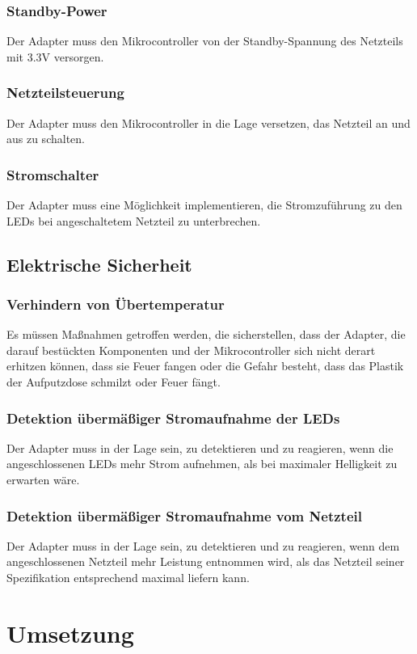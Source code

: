 \documentclass[a4paper,11pt]{article}
\begin{document}
\subsubsection{Standby-Power}
Der Adapter muss den Mikrocontroller
von der Standby-Spannung
des Netzteils mit 3.3V versorgen.

\subsubsection{Netzteilsteuerung}
Der Adapter muss den Mikrocontroller in die Lage versetzen,
das Netzteil an und aus zu schalten.

\subsubsection{Stromschalter}
Der Adapter muss eine M\"oglichkeit implementieren,
die Stromzuf\"uhrung zu den LEDs
bei angeschaltetem Netzteil zu unterbrechen.

\newpage
\subsection{Elektrische Sicherheit}
\subsubsection{Verhindern von \"Ubertemperatur}
Es m\"ussen Ma{\ss}nahmen getroffen werden, die sicherstellen,
dass der Adapter,
die darauf best\"uckten Komponenten
und der Mikrocontroller
sich nicht derart erhitzen k\"onnen,
dass sie Feuer fangen oder die Gefahr besteht,
dass das Plastik der Aufputzdose
schmilzt oder Feuer f\"angt.

\subsubsection{Detektion \"uberm\"a{\ss}iger Stromaufnahme der LEDs}
Der Adapter muss in der Lage sein, zu detektieren und zu reagieren,
wenn die angeschlossenen LEDs mehr Strom aufnehmen,
als bei maximaler Helligkeit zu erwarten w\"are.

\subsubsection{Detektion \"uberm\"a{\ss}iger Stromaufnahme vom Netzteil}
Der Adapter muss in der Lage sein, zu detektieren und zu reagieren,
wenn dem angeschlossenen Netzteil mehr Leistung entnommen wird,
als das Netzteil seiner Spezifikation entsprechend maximal liefern kann.


\newpage
\section{Umsetzung}
\end{document}
